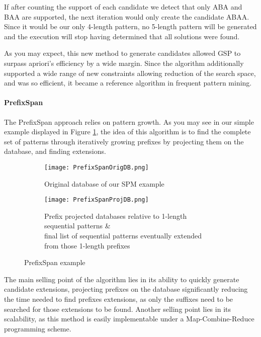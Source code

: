 \documentclass{eplmastersthesis}
\begin{document}
If after counting the support of each candidate we detect that only ABA and BAA are supported, the next iteration would only create the candidate ABAA. Since it would be our only 4-length pattern, no 5-length pattern will be generated and the execution will stop having determined that all solutions were found. \newline

As you may expect, this new method to generate candidates allowed GSP to surpass apriori's efficiency by a wide margin. Since the algorithm additionally supported a wide range of new constraints allowing reduction of the search space, and was so efficient, it became a reference algorithm in frequent pattern mining.

\paragraph{PrefixSpan}

The PrefixSpan approach \cite{pei2004mining, han2001prefixspan} relies on pattern growth. As you may see in our simple example displayed in Figure \ref{ex:PrefixSpanExample}, the idea of this algorithm is to find the complete set of patterns through iteratively growing prefixes by projecting them on the database, and finding extensions. \newline

\begin{figure}[h]
  \centering
  \begin{subfigure}{\textwidth}
  	\centering
    \texttt{[image: PrefixSpanOrigDB.png]}
    \caption{Original database of our SPM example}
  \end{subfigure}
  \begin{subfigure}{\textwidth}
  	\centering
    \texttt{[image: PrefixSpanProjDB.png]}
    \caption[Prefix projected database \& sequential pattern]{
			Prefix projected databases relative to 1-length sequential patterns \& \\
			final list of sequential patterns eventually extended from those 1-length prefixes
		\endtabular
	}
  \end{subfigure}
  \caption{PrefixSpan example}
  \label{ex:PrefixSpanExample}
\end{figure}

The main selling point of the algorithm lies in its ability to quickly generate candidate extensions, projecting prefixes on the database significantly reducing the time needed to find prefixes extensions, as only the suffixes need to be searched for those extensions to be found. Another selling point lies in its scalability, as this method is easily implementable under a Map-Combine-Reduce programming scheme. \newline
\end{document}
